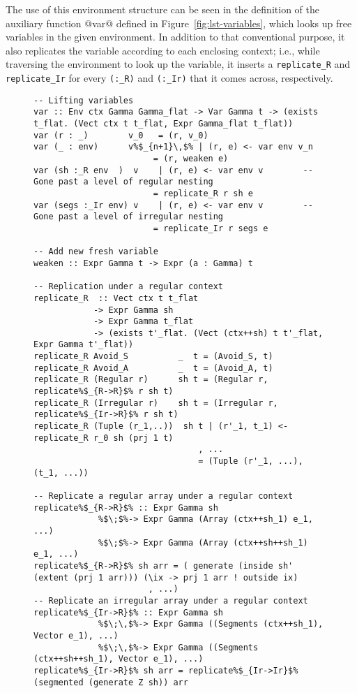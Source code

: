 The use of this environment structure can be seen in the definition of the auxiliary function @var@ defined in Figure~\ref{fig:lst-variables}, which looks up free variables in the given environment. In addition to that conventional purpose, it also replicates the variable according to each enclosing context; i.e., while traversing the environment to look up the variable, it inserts a \lstinline[style=ndp]{replicate_R} and \lstinline[style=ndp]{replicate_Ir} for every \lstinline[style=ndp]{(:_R)} and \lstinline[style=ndp]{(:_Ir)} that it comes across, respectively.
%
\begin{figure}
\begin{lstlisting}[style=ndp]
-- Lifting variables
var :: Env ctx Gamma Gamma_flat -> Var Gamma t -> (exists t_flat. (Vect ctx t t_flat, Expr Gamma_flat t_flat))
var (r : _)        v_0   = (r, v_0)
var (_ : env)      v%$_{n+1}\,$% | (r, e) <- var env v_n
                        = (r, weaken e)
var (sh :_R env  )  v    | (r, e) <- var env v        -- Gone past a level of regular nesting
                        = replicate_R r sh e
var (segs :_Ir env) v    | (r, e) <- var env v        -- Gone past a level of irregular nesting
                        = replicate_Ir r segs e

-- Add new fresh variable
weaken :: Expr Gamma t -> Expr (a : Gamma) t

-- Replication under a regular context
replicate_R  :: Vect ctx t t_flat
            -> Expr Gamma sh
            -> Expr Gamma t_flat
            -> (exists t'_flat. (Vect (ctx++sh) t t'_flat, Expr Gamma t'_flat))
replicate_R Avoid_S          _  t = (Avoid_S, t)
replicate_R Avoid_A          _  t = (Avoid_A, t)
replicate_R (Regular r)      sh t = (Regular r, replicate%$_{R->R}$% r sh t)
replicate_R (Irregular r)    sh t = (Irregular r, replicate%$_{Ir->R}$% r sh t)
replicate_R (Tuple (r_1,..))  sh t | (r'_1, t_1) <- replicate_R r_0 sh (prj 1 t)
                                 , ...
                                 = (Tuple (r'_1, ...), (t_1, ...))

-- Replicate a regular array under a regular context
replicate%$_{R->R}$% :: Expr Gamma sh
             %$\;$%-> Expr Gamma (Array (ctx++sh_1) e_1, ...)
             %$\;$%-> Expr Gamma (Array (ctx++sh++sh_1) e_1, ...)
replicate%$_{R->R}$% sh arr = ( generate (inside sh' (extent (prj 1 arr))) (\ix -> prj 1 arr ! outside ix)
                       , ...)
-- Replicate an irregular array under a regular context
replicate%$_{Ir->R}$% :: Expr Gamma sh
             %$\;\,$%-> Expr Gamma ((Segments (ctx++sh_1), Vector e_1), ...)
             %$\;\,$%-> Expr Gamma ((Segments (ctx++sh++sh_1), Vector e_1), ...)
replicate%$_{Ir->R}$% sh arr = replicate%$_{Ir->Ir}$% (segmented (generate Z sh)) arr


\end{lstlisting}
\end{figure}

